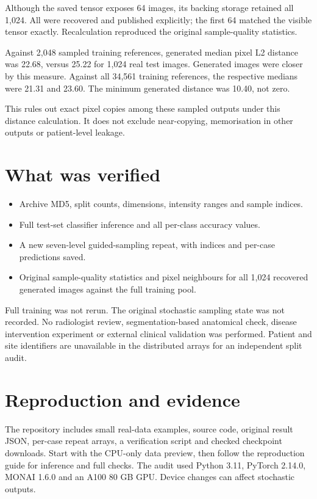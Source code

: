 \documentclass[11pt,a4paper]{article}
\begin{document}
Although the saved tensor exposes 64 images, its backing storage retained all 1,024. All were recovered and published explicitly; the first 64 matched the visible tensor exactly. Recalculation reproduced the original sample-quality statistics.

Against 2,048 sampled training references, generated median pixel L2 distance was 22.68, versus 25.22 for 1,024 real test images. Generated images were closer by this measure. Against all 34,561 training references, the respective medians were 21.31 and 23.60. The minimum generated distance was 10.40, not zero.

This rules out exact pixel copies among these sampled outputs under this distance calculation. It does not exclude near-copying, memorisation in other outputs or patient-level leakage.

\section*{What was verified}
\begin{itemize}
\item Archive MD5, split counts, dimensions, intensity ranges and sample indices.
\item Full test-set classifier inference and all per-class accuracy values.
\item A new seven-level guided-sampling repeat, with indices and per-case predictions saved.
\item Original sample-quality statistics and pixel neighbours for all 1,024 recovered generated images against the full training pool.
\end{itemize}
Full training was not rerun. The original stochastic sampling state was not recorded. No radiologist review, segmentation-based anatomical check, disease intervention experiment or external clinical validation was performed. Patient and site identifiers are unavailable in the distributed arrays for an independent split audit.

\section*{Reproduction and evidence}
The repository includes small real-data examples, source code, original result JSON, per-case repeat arrays, a verification script and checked checkpoint downloads. Start with the CPU-only data preview, then follow the reproduction guide for inference and full checks. The audit used Python 3.11, PyTorch 2.14.0, MONAI 1.6.0 and an A100 80 GB GPU. Device changes can affect stochastic outputs.
\end{document}
